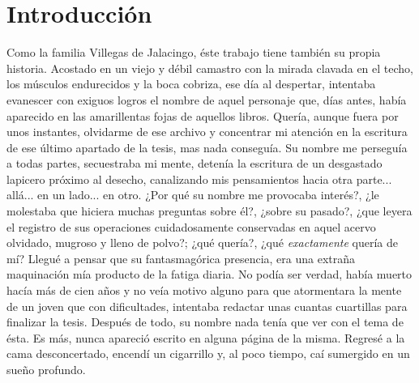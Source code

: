 \documentclass[14pt,twoside,final]{extbook} %
\begin{document}
\chapter*{Introducción}\label{ch:introduccion}
\pagestyle{empty}
\thispagestyle{empty}
\pagestyle{fancy}
\fancyhf{} %
\fancyhead[RO,LE]{\thepage}
\renewcommand{\headrulewidth}{0pt}
\setcounter{page}{21}
Como la familia Villegas de Jalacingo, éste trabajo tiene también su propia historia. Acostado en un viejo y débil camastro con la mirada clavada en el techo, los músculos endurecidos y la boca cobriza, ese día al despertar, intentaba evanescer con exiguos logros el nombre de aquel personaje que, días antes, había aparecido en las amarillentas fojas de aquellos libros. Quería, aunque fuera por unos instantes, olvidarme de ese archivo y concentrar mi atención en la escritura de ese último apartado de la tesis, mas nada conseguía. Su nombre me perseguía a todas partes, secuestraba mi mente, detenía la escritura de un desgastado lapicero próximo al desecho, canalizando mis pensamientos hacia otra parte... allá... en un lado... en otro. ¿Por qué su nombre me provocaba interés?, ¿le molestaba que hiciera muchas preguntas sobre él?, ¿sobre su pasado?, ¿que leyera el registro de sus operaciones cuidadosamente conservadas en aquel acervo olvidado, mugroso y lleno de polvo?; ¿qué quería?, ¿qué \emph{exactamente} quería de mí? Llegué a pensar que su fantasmagórica presencia, era una extraña maquinación mía producto de la fatiga diaria. No podía ser verdad, había muerto hacía más de cien años y no veía motivo alguno para que atormentara la mente de un joven que con dificultades, intentaba redactar unas cuantas cuartillas para finalizar la tesis. Después de todo, su nombre nada tenía que ver con el tema de ésta. Es más, nunca apareció escrito en alguna página de la misma. Regresé a la cama desconcertado, encendí un cigarrillo y, al poco tiempo, caí sumergido en un sueño profundo.
\end{document}
